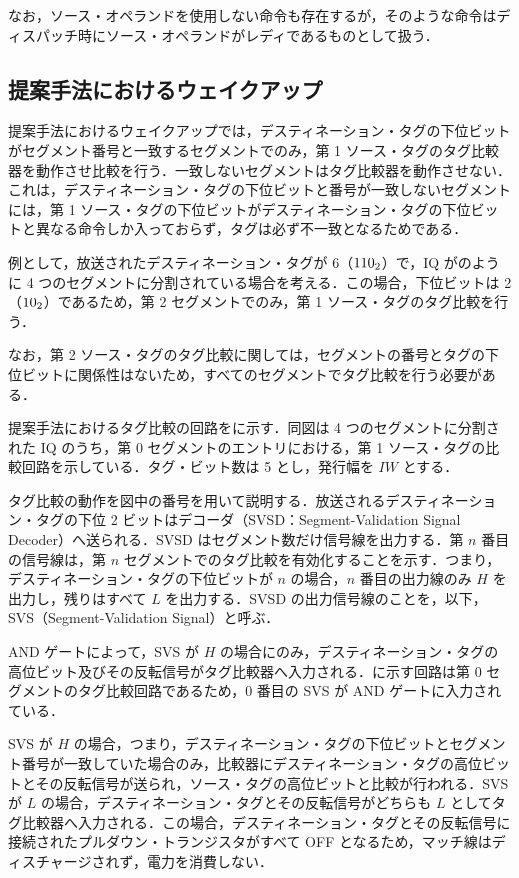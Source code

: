 なお，ソース・オペランドを使用しない命令も存在するが，そのような命令はディスパッチ時にソース・オペランドがレディであるものとして扱う．


\subsection{提案手法におけるウェイクアップ}
提案手法におけるウェイクアップでは，デスティネーション・タグの下位ビットがセグメント番号と一致するセグメントでのみ，第 1 ソース・タグのタグ比較器を動作させ比較を行う．一致しないセグメントはタグ比較器を動作させない．これは，デスティネーション・タグの下位ビットと番号が一致しないセグメントには，第 1 ソース・タグの下位ビットがデスティネーション・タグの下位ビットと異なる命令しか入っておらず，タグは必ず不一致となるためである．

例として，放送されたデスティネーション・タグが 6（${\rm 110_2}$）で，IQ がのように 4 つのセグメントに分割されている場合を考える．この場合，下位ビットは 2（${\rm 10_2}$）であるため，第 2 セグメントでのみ，第 1 ソース・タグのタグ比較を行う．

なお，第 2 ソース・タグのタグ比較に関しては，セグメントの番号とタグの下位ビットに関係性はないため，すべてのセグメントでタグ比較を行う必要がある．

提案手法におけるタグ比較の回路をに示す．同図は 4 つのセグメントに分割された IQ のうち，第 0 セグメントのエントリにおける，第 1 ソース・タグの比較回路を示している．タグ・ビット数は 5 とし，発行幅を $IW$ とする．

タグ比較の動作を図中の番号を用いて説明する．放送されるデスティネーション・タグの下位 2 ビットはデコーダ（SVSD：Segment-Validation Signal Decoder）へ送られる．SVSD はセグメント数だけ信号線を出力する．第 $n$ 番目の信号線は，第 $n$ セグメントでのタグ比較を有効化することを示す．つまり，デスティネーション・タグの下位ビットが $n$ の場合，$n$ 番目の出力線のみ $H$ を出力し，残りはすべて $L$ を出力する．SVSD の出力信号線のことを，以下， SVS（Segment-Validation Signal）と呼ぶ．

AND ゲートによって，SVS が $H$ の場合にのみ，デスティネーション・タグの高位ビット及びその反転信号がタグ比較器へ入力される．に示す回路は第 0 セグメントのタグ比較回路であるため，0 番目の SVS が AND ゲートに入力されている．

SVS が $H$ の場合，つまり，デスティネーション・タグの下位ビットとセグメント番号が一致していた場合のみ，比較器にデスティネーション・タグの高位ビットとその反転信号が送られ，ソース・タグの高位ビットと比較が行われる．SVS が $L$ の場合，デスティネーション・タグとその反転信号がどちらも $L$ としてタグ比較器へ入力される．この場合，デスティネーション・タグとその反転信号に接続されたプルダウン・トランジスタがすべて OFF となるため，マッチ線はディスチャージされず，電力を消費しない．

